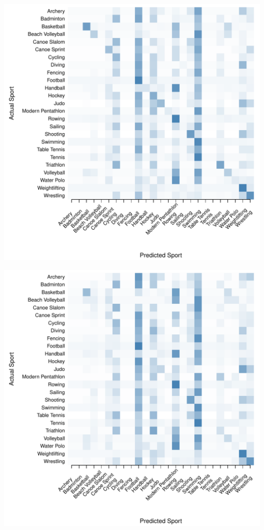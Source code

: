 \documentclass[landscape, paperwidth=42in, paperheight=36in,
fontscale=.35, margin=1in]{baposter}
\begin{document}
\begin{poster}
{\begin{center}
  \begin{minipage}{0.45\textwidth}
    \begin{center}
      \includegraphics[scale=0.27]{../graphics/sportCIT-trn.pdf}
    \end{center}
  \end{minipage}
  \hspace{0.05\textwidth}
  \begin{minipage}{0.45\textwidth}
    \begin{center}
      \includegraphics[scale=0.27]{../graphics/sportCIT-tst.pdf}
    \end{center}
  \end{minipage}




\end{center}}
\end{poster}
\end{document}
